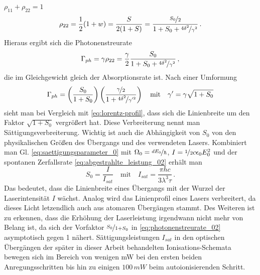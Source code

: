$\rho_{11}+\rho_{22}=1$
\begin{equation}\label{eq:besetzung_22}
	\rho_{22}=\frac{1}{2}(1+w)=\frac{S}{2(1+S)}=\frac{\nicefrac{S_0}{2}}{1+S_0+\nicefrac{4\delta^2}{\gamma^2}}\,.
\end{equation}
Hieraus ergibt sich die Photonenstreurate
\begin{equation}\label{eq:photonenstreurate_01}
	\Gamma_{ph}=\gamma\rho_{22}=\frac{\gamma}{2}\frac{S_0}{1+S_0+\nicefrac{4\delta^2}{\gamma^2}}\,,
\end{equation}
die im Gleichgewicht gleich der Absorptionsrate ist.
Nach einer Umformung
\begin{equation}\label{eq:photonenstreurate_02}
	\Gamma_{ph}=\left(\frac{S_0}{1+S_0}\right)\left(\frac{\nicefrac{\gamma}{2}}{1+\nicefrac{4\delta^2}{\gamma'^2}}\right)
	\quad\text{mit}\quad
	\gamma'=\gamma\sqrt{1+S_0}
\end{equation}
sieht man bei Vergleich mit \eqref{eq:lorentz-profil}, dass sich die
Linienbreite um den Faktor $\sqrt{1+S_0}$ vergrößert hat. Diese Verbreiterung
nennt man Sättigungsverbreiterung. Wichtig ist auch die Abhängigkeit von $S_0$
von den physikalischen Größen des Übergangs und des verwendeten Lasers.
Kombiniert man Gl. \eqref{eq:saettigungsparameter_0} mit
$\Omega_0=\nicefrac{dE_0}{\hbar}$, $I=\nicefrac{1}{2}c\epsilon_0E_0^2$ und der
spontanen Zerfallsrate \eqref{eq:abgestrahlte_leistung_02} erhält man
\begin{equation}\label{eq:saettigungsparameter_physikalische_groessen}
		S_0=\frac{I}{I_{sat}}
		\quad\text{mit}\quad
		I_{sat}=\frac{\pi hc}{3\lambda^3\tau}\,.
\end{equation}
Das bedeutet, dass die Linienbreite eines Übergangs mit der Wurzel der
Laserintensität $I$ wächst. Analog wird das Linienprofil eines Lasers
verbreitert, da dieses Licht letzendlich auch aus atomaren Übergängen stammt. Des Weiteren
ist zu erkennen, dass die Erhöhung der Laserleistung irgendwann nicht mehr
von Belang ist, da sich der Vorfaktor $\nicefrac{S_0}{1+S_0}$ in
\eqref{eq:photonenstreurate_02} asymptotisch gegen 1 nähert.
Sättigungsleistungen $I_{sat}$ in den optischen Übergängen der später in dieser
Arbeit behandelten Ionisations-Schemata bewegen sich im Bereich von wenigen
mW bei den ersten beiden Anregungsschritten bis hin zu einigen
$100\,mW$ beim autoionisierenden Schritt.

